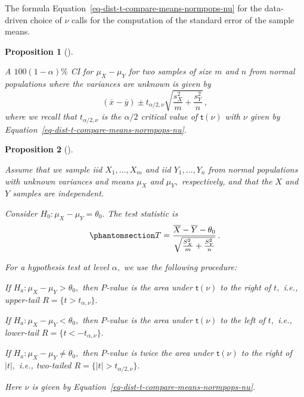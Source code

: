 \documentclass[
  a4paper,
  DIV=11,
  numbers=noendperiod,
  oneside]{scrreprt}
\theoremstyle{plain}
\theoremstyle{definition}
\theoremstyle{definition}
\theoremstyle{definition}
\theoremstyle{plain}
\newtheorem{proposition}{Proposition}[chapter]
\theoremstyle{remark}
\begin{document}
The formula Equation~\ref{eq-dist-t-compare-means-normpops-nu} for the
data-driven choice of \(\nu\) calls for the computation of the standard
error of the sample means.

\begin{proposition}[]\protect\hypertarget{prp-ci-compare-means-normpops-vars-unknown}{}\label{prp-ci-compare-means-normpops-vars-unknown}

A \(100(1-\alpha)\%\) CI for \(\mu_X - \mu_Y\) for two samples of size
\(m\) and \(n\) from normal populations where the variances are unknown
is given by \[
 (\overline{x} - \overline{y}) \pm t_{\alpha/2, \nu} \sqrt{ \frac{s_X^2}{m} + \frac{s_Y^2}{n}}\,,
\] where we recall that \(t_{\alpha/2, \nu}\) is the \(\alpha/2\)
critical value of \(\mathsf{t}(\nu)\) with \(\nu\) given by
Equation~\ref{eq-dist-t-compare-means-normpops-nu}.

\end{proposition}

\begin{proposition}[]\protect\hypertarget{prp-htest-compare-means-normpops-vars-unknown}{}\label{prp-htest-compare-means-normpops-vars-unknown}

Assume that we sample iid \(X_1, \dots, X_m\) and iid
\(Y_1, \dots, Y_n\) from normal populations with unknown variances and
means \(\mu_X\) and \(\mu_Y,\) respectively, and that the \(X\) and
\(Y\) samples are independent.

Consider \(H_0 : \mu_X - \mu_Y = \theta_0.\) The test statistic is
\begin{equation}\phantomsection\label{eq-htest-compare-means-normpops-vars-unknown-statistic}{
 T = \frac{\overline{X} - \overline{Y} - \theta_0}{\sqrt{\frac{S_{X}^2}{m} + \frac{S_{Y}^2}{n}}}\,.
}\end{equation}

For a hypothesis test at level \(\alpha,\) we use the following
procedure:

If \(H_a : \mu_X - \mu_Y > \theta_0,\) then \(P\)-value is the area
under \(\mathsf{t}(\nu)\) to the right of \(t,\) i.e., upper-tail
\(R = \{t > t_{\alpha,\nu}\}.\)

If \(H_a : \mu_X - \mu_Y < \theta_0,\) then \(P\)-value is the area
under \(\mathsf{t}(\nu)\) to the left of \(t,\) i.e., lower-tail
\(R = \{t < - t_{\alpha,\nu}\}.\)

If \(H_a : \mu_X - \mu_Y \neq \theta_0,\) then \(P\)-value is twice the
area under \(\mathsf{t}(\nu)\) to the right of \(|t|,\) i.e., two-tailed
\(R = \{|t| > t_{\alpha/2, \nu}\}.\)

Here \(\nu\) is given by
Equation~\ref{eq-dist-t-compare-means-normpops-nu}.

\end{proposition}
\end{document}
